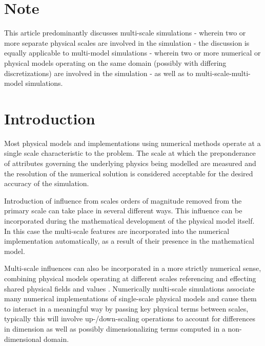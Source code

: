 \documentclass[11pt]{siamltex1213}
\begin{document}
\maketitle

\begin{abstract}
\end{abstract}

\section{Note}\label{note}
This article predominantly discusses multi-scale simulations - wherein two or more separate physical scales are involved in the simulation - the discussion is equally applicable to multi-model simulations - wherein two or more numerical or physical models operating on the same domain (possibly with differing discretizations) are involved in the simulation - as well as to multi-scale-multi-model simulations.

\section{Introduction}\label{introduction}
\label{single_scale_simulations}
Most physical models and implementations using numerical methods operate at a single scale characteristic to the problem. The scale at which the preponderance of attributes governing the underlying physics being modelled are measured and the resolution of the numerical solution is considered acceptable for the desired accuracy of the simulation.

\label{multi_scale_simulations}
Introduction of influence from scales orders of magnitude removed from the primary scale can take place in several different ways. This influence can be incorporated during the mathematical development of the physical model itself. In this case the multi-scale features are incorporated into the numerical implementation automatically, as a result of their presence in the mathematical model. 

Multi-scale influences can also be incorporated in a more strictly numerical sense, combining physical models operating at different scales referencing and effecting shared physical fields and values \cite{shenoy97} \cite{weinan2003heterogenous}. Numerically multi-scale simulations associate many numerical implementations of single-scale physical models and cause them to interact in a meaningful way by passing key physical terms between scales, typically this will involve up-/down-scaling operations to account for differences in dimension as well as possibly dimensionalizing terms computed in a non-dimensional domain. 
\end{document}
